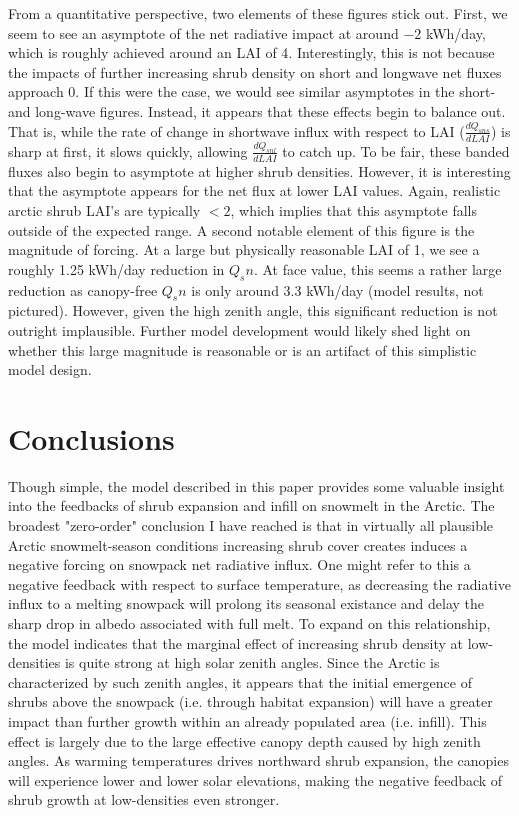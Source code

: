 \documentclass[
10pt, %
letterpaper, %
oneside, %
headinclude,footinclude, %
BCOR5mm, %
]{scrartcl}
\begin{document}
From a quantitative perspective, two elements of these figures stick out. First, we seem to see an asymptote of the net radiative impact at around $-2$ kWh/day, which is roughly achieved around an LAI of 4. Interestingly, this is not because the impacts of further increasing shrub density on short and longwave net fluxes approach 0. If this were the case, we would see similar asymptotes in the short- and long-wave figures. Instead, it appears that these effects begin to balance out. That is, while the rate of change in shortwave influx with respect to LAI ($\frac{dQ_{sns}}{dLAI}$) is sharp at first, it slows quickly, allowing $\frac{dQ_{snl}}{dLAI}$ to catch up. To be fair, these banded fluxes also begin to asymptote at higher shrub densities. However, it is interesting that the asymptote appears for the net flux at lower LAI values. Again, realistic arctic shrub LAI's are typically $<2$, which implies that this asymptote falls outside of the expected range. A second notable element of this figure is the magnitude of forcing. At a large but physically reasonable LAI of 1, we see a roughly 1.25 kWh/day reduction in $Q_sn$. At face value, this seems a rather large reduction as canopy-free $Q_sn$ is only around 3.3 kWh/day (model results, not pictured). However, given the high zenith angle, this significant reduction is not outright implausible. Further model development would likely shed light on whether this large magnitude is reasonable or is an artifact of this simplistic model design.


\section{Conclusions}
Though simple, the model described in this paper provides some valuable insight into the feedbacks of shrub expansion and infill on snowmelt in the Arctic. The broadest "zero-order" conclusion I have reached is that in virtually all plausible Arctic snowmelt-season conditions increasing shrub cover creates induces a negative forcing on snowpack net radiative influx. One might refer to this a negative feedback with respect to surface temperature, as decreasing the radiative influx to a melting snowpack will prolong its seasonal existance and delay the sharp drop in albedo associated with full melt. To expand on this relationship, the model indicates that the marginal effect of increasing shrub density at low-densities is quite strong at high solar zenith angles. Since the Arctic is characterized by such zenith angles, it appears that the initial emergence of shrubs above the snowpack (i.e. through habitat expansion) will have a greater impact than further growth within an already populated area (i.e. infill). This effect is largely due to the large effective canopy depth caused by high zenith angles. As warming temperatures drives northward shrub expansion, the canopies will experience lower and lower solar elevations, making the negative feedback of shrub growth at low-densities even stronger.
\end{document}
